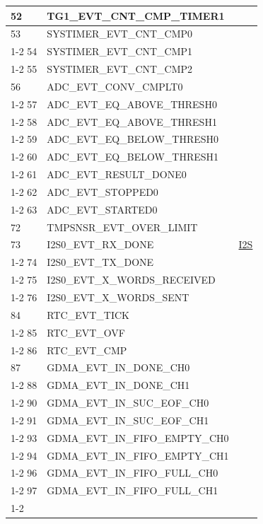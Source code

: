 \documentclass[main\_\_EN.tex]{subfiles}
\begin{document}
\begin{longtable}{ | l | l | l | }
52  & TG1\_EVT\_CNT\_CMP\_TIMER1    & \\ \hline
53  & SYSTIMER\_EVT\_CNT\_CMP0  & \nameref{mod:systimer}     \\ \cline{1-2}
54  & SYSTIMER\_EVT\_CNT\_CMP1  & \\ \cline{1-2}
55  & SYSTIMER\_EVT\_CNT\_CMP2  & \\ \hline
56  & ADC\_EVT\_CONV\_CMPLT0    & \nameref{mod:adc}   \\ \cline{1-2}
57  & ADC\_EVT\_EQ\_ABOVE\_THRESH0     & \\ \cline{1-2}
58  & ADC\_EVT\_EQ\_ABOVE\_THRESH1     & \\ \cline{1-2}
59  & ADC\_EVT\_EQ\_BELOW\_THRESH0     & \\ \cline{1-2}
60  & ADC\_EVT\_EQ\_BELOW\_THRESH1     & \\ \cline{1-2}
61  & ADC\_EVT\_RESULT\_DONE0     & \\ \cline{1-2}
62  & ADC\_EVT\_STOPPED0 & \\ \cline{1-2}
63  & ADC\_EVT\_STARTED0 & \\ \hline
72 & TMPSNSR\_EVT\_OVER\_LIMIT & \nameref{mod:tmpsen}  \\ \hline
73 & I2S0\_EVT\_RX\_DONE & \hyperref[mod:i2s]{I2S}   \\ \cline{1-2}
74 & I2S0\_EVT\_TX\_DONE & \\ \cline{1-2}
75 & I2S0\_EVT\_X\_WORDS\_RECEIVED     & \\ \cline{1-2}
76 & I2S0\_EVT\_X\_WORDS\_SENT  & \\ \hline
84 & RTC\_EVT\_TICK     & \nameref{mod:rtctimer}   \\ \cline{1-2}
85 & RTC\_EVT\_OVF      & \\ \cline{1-2}
86 & RTC\_EVT\_CMP      & \\ \hline
87 & GDMA\_EVT\_IN\_DONE\_CH0  &  \nameref{mod:dma} \\ \cline{1-2}
88 & GDMA\_EVT\_IN\_DONE\_CH1  & \\ \cline{1-2}
90 & GDMA\_EVT\_IN\_SUC\_EOF\_CH0     & \\ \cline{1-2}
91 & GDMA\_EVT\_IN\_SUC\_EOF\_CH1     & \\ \cline{1-2}
93 & GDMA\_EVT\_IN\_FIFO\_EMPTY\_CH0  & \\ \cline{1-2}
94 & GDMA\_EVT\_IN\_FIFO\_EMPTY\_CH1  & \\ \cline{1-2}
96 & GDMA\_EVT\_IN\_FIFO\_FULL\_CH0   & \\ \cline{1-2}
97 & GDMA\_EVT\_IN\_FIFO\_FULL\_CH1   & \\ \cline{1-2}

\end{longtable}
\end{document}

